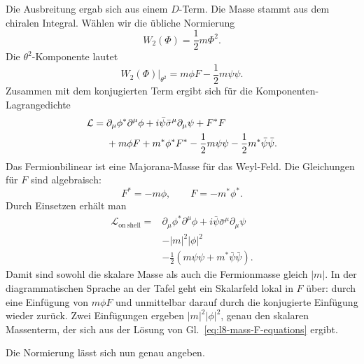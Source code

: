 Die Ausbreitung ergab sich aus einem \(D\)-Term. Die Masse stammt aus dem chiralen Integral. Wählen wir die übliche Normierung
\begin{equation}
W_2(\Phi)=\frac12m\Phi^2.
\end{equation}
Die \(\theta^2\)-Komponente lautet
\begin{equation}
\left.W_2(\Phi)\right|_{\theta^2}
=m\phi F-\frac12m\psi\psi.
\end{equation}
Zusammen mit dem konjugierten Term ergibt sich für die Komponenten-Lagrangedichte
\begin{align}
\mathcal L
={}&
\partial_\mu\phi^\ast\partial^\mu\phi
+i\bar\psi\bar\sigma^\mu\partial_\mu\psi
+F^\ast F
\notag\\
&+m\phi F+m^\ast\phi^\ast F^\ast
-\frac12m\psi\psi
-\frac12m^\ast\bar\psi\bar\psi.
\label{eq:l8-mass-offshell}
\end{align}
Das Fermionbilinear ist eine Majorana-Masse für das Weyl-Feld. Die Gleichungen für \(F\) sind algebraisch:
\begin{equation}
F^\ast=-m\phi,
\qquad
F=-m^\ast\phi^\ast.
\label{eq:l8-mass-F-equations}
\end{equation}
Durch Einsetzen erhält man
\begin{equation}
\begin{aligned}
\mathcal L_{\mathrm{on\ shell}}={}&
\partial_\mu\phi^\ast\partial^\mu\phi
+i\bar\psi\bar\sigma^\mu\partial_\mu\psi\\
&-|m|^2|\phi|^2\\
&-\frac12\left(m\psi\psi+m^\ast\bar\psi\bar\psi\right).
\end{aligned}
\label{eq:l8-mass-onshell}
\end{equation}
Damit sind sowohl die skalare Masse als auch die Fermionmasse gleich \(|m|\). In der diagrammatischen Sprache an der Tafel geht ein Skalarfeld lokal in \(F\) über: durch eine Einfügung von \(m\phi F\) und unmittelbar darauf durch die konjugierte Einfügung wieder zurück. Zwei Einfügungen ergeben \(|m|^2|\phi|^2\), genau den skalaren Massenterm, der sich aus der Lösung von Gl.~\eqref{eq:l8-mass-F-equations} ergibt.

Die Normierung lässt sich nun genau angeben.

